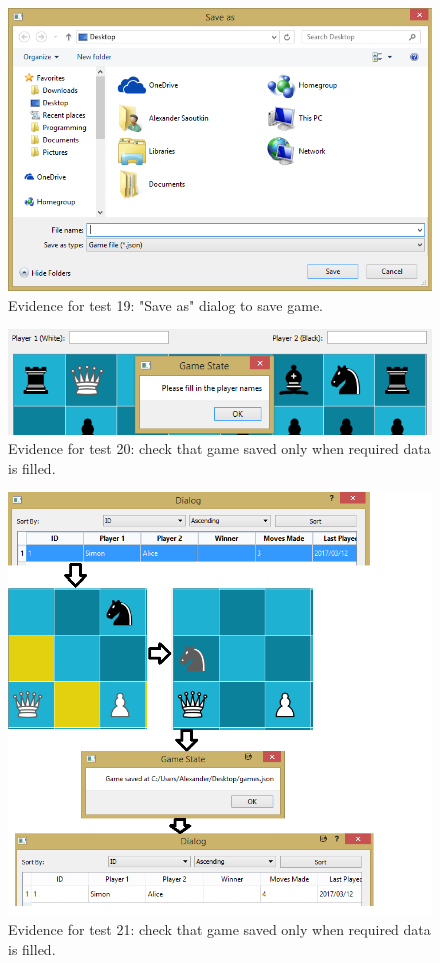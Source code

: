 \documentclass[twoside, 12pt]{report}
\begin{document}
\begin{figure}[H]
	\centering
	\includegraphics[width=1.0\textwidth]{images/screenshots/test-17}
	\caption{Evidence for test 19: "Save as" dialog to save game.}
	\label{test-19}
\end{figure}
\begin{figure}[H]
	\centering
	\includegraphics[width=1.0\textwidth]{images/screenshots/test-20}
	\caption{Evidence for test 20: check that game saved only when required data is filled.}
	\label{test-20}
\end{figure}
\begin{figure}[H]
	\centering
	\includegraphics[width=1.0\textwidth]{images/screenshots/test-21}
	\caption{Evidence for test 21: check that game saved only when required data is filled.}
	\label{test-21}
\end{figure}
\end{document}
